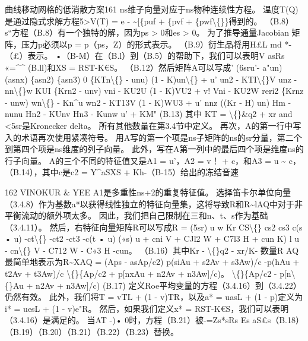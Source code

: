 \documentclass[UTF8,11pt,a4paper,openany,fontset=fandol]{ctexbook}
\begin{document}
曲线移动网格的低消散方案161 ns维子向量对应于ns物种连续性方程。 温度T(Q)是通过隐式求解方程5>V(T) = e - \textasciitilde{}[\{puf + \{pvf + \{pwf\textbackslash\{\}\}得到的。 （B.8）s“方程（B.8）有一个独特的解，因为ps > 0和es > 0。 为了推导通量Jacobian 矩阵，压力p必须以p = p（ps，Z）的形式表示。 （B.9）衍生品将用H£L md *-（£）表示。 •（B-M）在（B.l）到（B.5）的帮助下，我们可以表明V asRs «=\textasciicircum{}\textasciicircum{} (B.ll)和XS = RST-K€S。 （B.12）然后矩阵A可以写成' (6sru'- a"un) (asnx) \{asn2) \{asn3) 0 \{KTn\textbackslash\{\} - unu) (1 - K)un\textbackslash\{\} + u' un2 - KTI\textbackslash\{\}V unz - nn\textbackslash\{\}w KUI \{Krn2 - unv) vni - KU2U (1 - K)VU2 + v! Vni - KU2W reri2 \{Krnz - unw) wn\textbackslash\{\} - Kn\textasciicircum{}u wn2 - KT13V (1 - K)WU3 + u' nnz ((Kr - H) un) Hm - nunu Hn2 - KUnv Hn3 - Kunw u' + KM" (B.13) 其中 KT = \textbackslash\{\}\&q2 + xr and <5sr是Kronecker delta。 所有其他数量在第3.4节中定义。 再次，A的第一行中写入的术语再次使用紧凑符号。 用A写的第一个项是ns子矩阵的ns的sr分量，第二个到第四个项是ns维度的列子向量。 此外，写在A第一列中的最后四个项是维度ns的行子向量。 A的三个不同的特征值又是A1 = u'，A2 = v！ + c，和A3 = u \textasciitilde{} c，（B.14），其中c是c2 = Y\textasciicircum{}aSXS + Kh-（B-15）给出的冻结音速

162 VINOKUR \& YEE A1是多重性ns+2的重复特征值。 选择笛卡尔单位向量（3.4.8）作为基数a*以获得线性独立的特征向量集，这将导致R和R\textasciitilde{}lAQ中对于非平衡流动的额外项太多。 因此，我们把自己限制在三和n、t、s作为基础（3.4.11）。 然后，右特征向量矩阵R可以写成R = (5sr) u w Kr CS\textbackslash\{\} cs2 cs3 c(s • u) -ct\textbackslash\{\} -ct2 -ct3 -c(t • u) («s) u + cni V + CJl2 W + C7l3 H + cun K) l u - cn\textbackslash\{\} V - C712 W - C«3 H -cun。 （B.16）其中Kr - \textbackslash\{\}q2 - xr/K- 数量R AQ最简单地表示为R\textasciitilde{}XAQ = (Aps - asAp/c2) p(siAu + s2Av + s3Aw)/c -p(hAu + t2Av + t3Aw)/c \textbackslash\{\}\{Ap/c2 + p[nxAu + n2Av + n3Aw]/c)。 \textbackslash\{\}\{Ap/c2 - p[n\textbackslash\{\}Au + n2Av + n3Aw]/c) (B.17) 定义Roe平均变量的方程（3.4.16）到（3.4.22）仍然有效。 此外，我们将T = vTL + (1 - v)TR，以及a* = uasL + (1 - p)定义为i* = uesL + (1 - v)e"R。 然后，如果我们定义x* = RST-K€S，我们可以表明（3.4.16）是满足的。 当AT -)• 0时，方程（B.21）被-=Zs*sRs Es aS£s（B.18）（B.19）（B.20）（B.21）（B.22）（B.23）替换。
\end{document}
